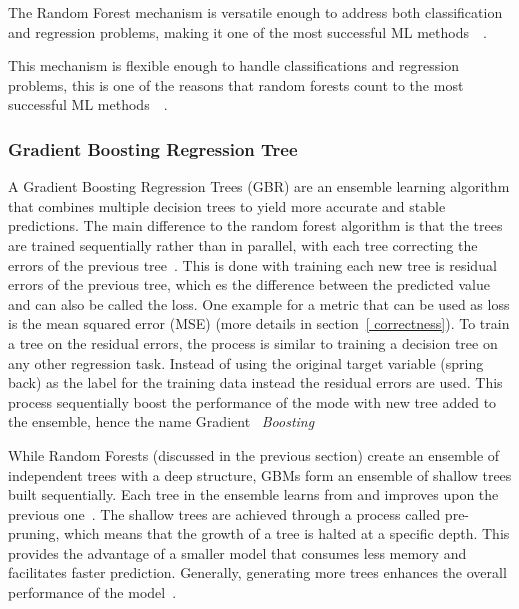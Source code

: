 The Random Forest mechanism is versatile enough to address both classification and regression problems, making it one
of the most successful
\ac{ML} methods~\cite[p. 3--4]{biau_randomforestguided_2016}~\cite[p. 25]{breiman_randomforests_2001}.

This mechanism is flexible enough to handle classifications and regression problems,
this is one of the reasons that random forests count to the most successful \ac{ML}
methods~\cite[p. 3--4]{biau_randomforestguided_2016}~\cite[p. 25]{breiman_randomforests_2001}.

\subsubsection{Gradient Boosting Regression Tree}

A Gradient Boosting Regression Trees (\ac{GBR}) are an ensemble learning algorithm that combines multiple decision trees
to yield more accurate and stable predictions.
The main difference to the random forest algorithm is that the trees are trained sequentially rather than in parallel,
with each tree correcting the errors of the previous tree~\cite[p. 88--89]{muller_introductionmachinelearning_2016}.
This is done with training each new tree is residual errors of the previous tree, which es the
difference between the predicted value and can also be called the loss.
One example for a metric that can be used as loss is the mean squared error (MSE) (more details in section~\ref{
    correctness}).
To train a tree on the residual errors, the process is similar to training a decision tree on any other regression
task.
Instead of using the original target variable (spring back) as the label for the training data instead the
residual errors are used.
This process sequentially boost the performance of the mode with new tree added to the
ensemble, hence the name Gradient ~\textit{Boosting}~\cite[p. 222]{boehmke2019hands}

While Random Forests (discussed in the previous section) create an ensemble of independent trees with a deep
structure, GBMs form an ensemble of shallow trees built sequentially.
Each tree in the ensemble learns from and improves upon the previous one~\cite[p. 221]{boehmke2019hands}.
The shallow trees are achieved through a process called pre-pruning, which means that the growth of a tree is halted
at a specific depth.
This provides the advantage of a smaller model that consumes less memory and facilitates faster prediction.
Generally, generating more trees enhances the overall performance of the
model~\cite[p. 88--89]{muller_introductionmachinelearning_2016}.

